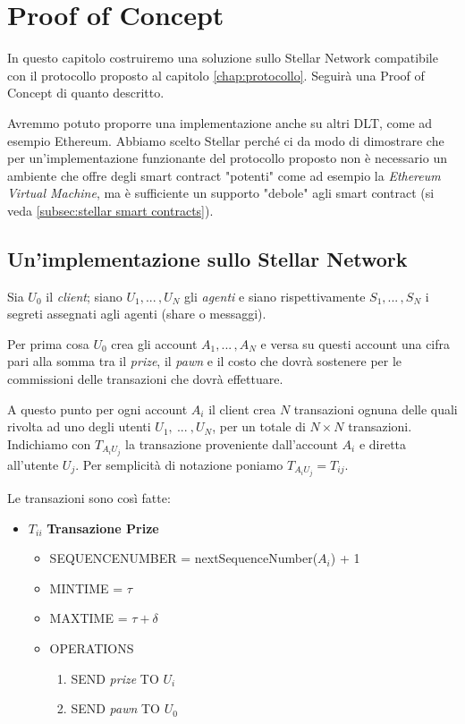 \chapter{Proof of Concept}

In questo capitolo costruiremo una soluzione sullo Stellar Network
compatibile con il protocollo proposto al capitolo \ref{chap:protocollo}.
Seguirà una Proof of Concept di quanto descritto.

Avremmo potuto proporre una
implementazione anche su altri DLT, come ad esempio Ethereum. Abbiamo scelto
Stellar perché ci da modo di dimostrare che per un'implementazione funzionante
del protocollo proposto non è necessario un ambiente che
offre degli smart contract "potenti" come ad esempio
la \textit{Ethereum Virtual Machine},
ma è sufficiente un supporto
"debole" agli smart contract (si veda \ref{subsec:stellar smart contracts}).


\section{Un'implementazione sullo Stellar Network}
Sia $ U_0 $ il \textit{client};
siano $ U_1, ...\, , U_N $ gli \textit{agenti} e
siano rispettivamente $ S_1, ...\, , S_N $ i segreti assegnati agli agenti
(share o messaggi).

Per prima cosa $ U_0 $ crea gli account $ A_1, ...\, , A_N $ e
versa su questi account una cifra pari alla somma tra
il \textit{prize}, il \textit{pawn} e il costo che dovrà sostenere per le commissioni
delle transazioni che dovrà effettuare.

A questo punto per ogni account $ A_i $ il client crea $ N $ transazioni
ognuna delle quali rivolta ad uno degli utenti $ U_1,\ ...\ , U_N $, per un totale
di $ N \times N $ transazioni. Indichiamo con $ T_{{A_i}{U_j}} $ la transazione
proveniente dall'account $ A_i $ e diretta all'utente $ U_j $.
Per semplicità di notazione poniamo $ T_{{A_i}{U_j}} = T_{ij} $.

Le transazioni sono così fatte:
\begin{itemize}
	\item $T_{ii} $ \textbf{Transazione Prize}
	      \begin{itemize}
		      \item SEQUENCE\textunderscore NUMBER = nextSequenceNumber($ A_i $) + 1
		      \item MIN\textunderscore TIME = $ \tau $
		      \item MAX\textunderscore TIME = $ \tau + \delta $
		      \item OPERATIONS
		            \begin{enumerate}
			            \item SEND \textit{prize} TO $ U_i $
			            \item SEND \textit{pawn} TO $ U_0 $
		            \end{enumerate}
	      \end{itemize}
\end{itemize}

